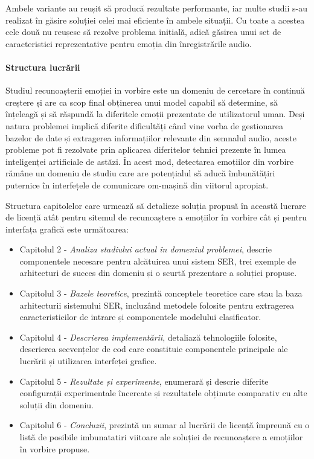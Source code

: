\documentclass[a4paper,12pt]{book}
\begin{document}
					Ambele variante au reușit să producă rezultate performante, iar multe studii s-au realizat în găsire soluției celei mai eficiente în ambele situații. Cu toate a acestea cele două nu reușesc să rezolve problema inițială, adică găsirea unui set de caracteristici reprezentative pentru emoția din înregistrările audio. \par
					\paragraph{Structura lucrării}
					\hfill \par
					Studiul recunoașterii emoției in vorbire este un domeniu de cercetare în continuă creștere și are ca scop final obținerea unui model capabil să determine, să înțeleagă și să răspundă la diferitele emoții prezentate de utilizatorul uman. Deși natura problemei implică diferite dificultăți când vine vorba de gestionarea bazelor de date și extragerea informațiilor relevante din semnalul audio, aceste probleme pot fi rezolvate prin aplicarea diferitelor tehnici prezente în lumea inteligenței artificiale de astăzi. În acest mod, detectarea emoțiilor din vorbire rămâne un domeniu de studiu care are potențialul să aducă îmbunătățiri puternice în interfețele de comunicare om-mașină din viitorul apropiat. \par
					Structura capitolelor care urmează să detalieze soluția propusă în această lucrare de licență atât pentru sitemul de recunoaștere a emoțiilor în vorbire cât și pentru interfața grafică este următoarea:
					\begin{itemize}
						\item Capitolul 2 - \textit{Analiza stadiului actual în domeniul problemei}, descrie componentele necesare pentru alcătuirea unui sistem SER, trei exemple de arhitecturi de succes din domeniu și o scurtă prezentare a soluției propuse.
						\item Capitolul 3 - \textit{Bazele teoretice}, prezintă conceptele teoretice care stau la baza arhitecturii sistemului SER, incluzând metodele folosite pentru extragerea caracteristicilor de intrare și componentele modelului clasificator. 
						\item Capitolul 4 - \textit{Descrierea implementării}, detaliază tehnologiile folosite, descrierea secvențelor de cod care constituie componentele principale ale lucrării și utilizarea interfeței grafice.
						\item Capitolul 5 - \textit{Rezultate și experimente}, enumerară și descrie diferite configurații experimentale încercate și rezultatele obținute comparativ cu alte soluții din domeniu.
						\item Capitolul 6 - \textit{Concluzii}, prezintă un sumar al lucrării de licență împreună cu o listă de posibile imbunatatiri viitoare ale soluției de recunoaștere a emoțiilor în vorbire propuse.
					\end{itemize} 
					
\end{document}
